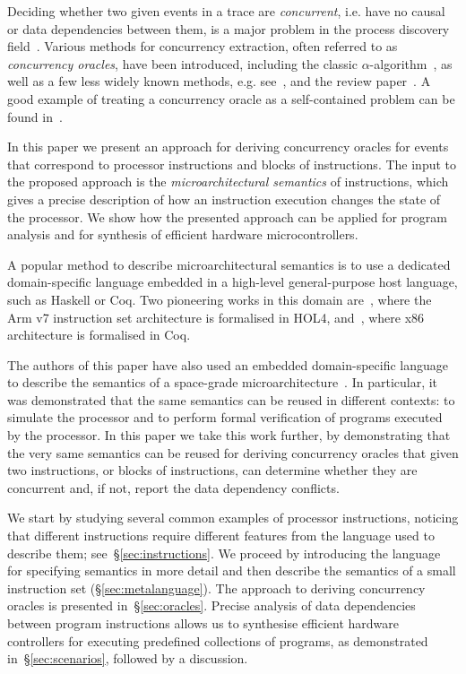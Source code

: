 Deciding whether two given events in a trace are \emph{concurrent}, i.e. have
no causal or data dependencies between them, is a major problem in the process
discovery field~\cite{2011_aalst_book}. Various methods for concurrency
extraction, often referred to as \emph{concurrency oracles}, have been
introduced, including the classic $\alpha$-algorithm~\cite{van2004workflow}, as
well as a few less widely known methods, e.g. see~\cite{cook1998event},
\cite{mokhov2016mining} and the review paper~\cite{augusto2017automated}. A
good example of treating a concurrency oracle as a self-contained problem can
be found in~\cite{dumas2015process}.

In this paper we present an approach for deriving concurrency oracles for
events that correspond to processor instructions and blocks of instructions. The
input to the proposed approach is the \emph{microarchitectural semantics} of
instructions, which gives a precise description of how an instruction execution
changes the state of the processor. We show how the presented approach can be
applied for program analysis and for synthesis of efficient hardware microcontrollers.

A popular method to describe microarchitectural semantics is to use a dedicated
domain-specific language embedded in a high-level general-purpose host language,
such as Haskell or Coq. Two pioneering works in this domain
are~\cite{fox2010trustworthy}, where the Arm v7 instruction set architecture
is formalised in HOL4, and~\cite{kennedy2013coq}, where x86 architecture is
formalised in Coq.

The authors of this paper have also used an embedded domain-specific language
to describe the semantics of a space-grade
microarchitecture~\cite{mokhov2018formal}. In particular, it was demonstrated
that the same semantics can be reused in different contexts: to simulate the
processor and to perform formal verification of programs executed by the
processor. In this paper we take this work further, by demonstrating that the
very same semantics can be reused for deriving concurrency oracles that given
two instructions, or blocks of instructions, can determine whether they are
concurrent and, if not, report the data dependency conflicts.

We start by studying several common examples of processor instructions, noticing
that different instructions require different features from the language used to
describe them; see~\S\ref{sec:instructions}. We proceed by introducing the
language for specifying semantics in more detail and then describe the semantics
of a small instruction set (\S\ref{sec:metalanguage}). The approach to deriving
concurrency oracles is presented in~\S\ref{sec:oracles}. Precise analysis of
data dependencies between program instructions allows us to synthesise efficient
hardware controllers for executing predefined collections of programs, as
demonstrated in~\S\ref{sec:scenarios}, followed by a discussion.
